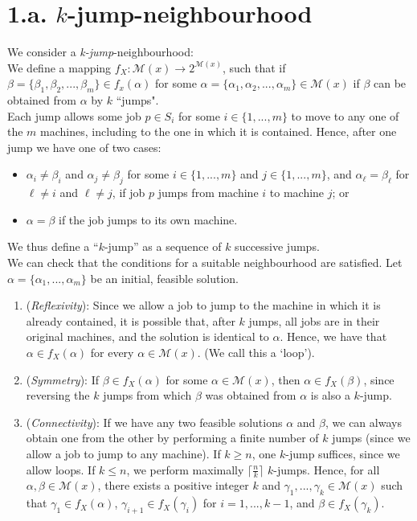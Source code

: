 \documentclass[12pt,a4paper,reqno]{article}
\begin{document}
\section*{1.a. $k$-jump-neighbourhood}

We consider a \textit{k-jump}-neighbourhood: \\

We define a mapping $f_X: \mathcal{M}(x) \rightarrow 2^{\mathcal{M}(x)}$, such that if $\beta = \{\beta_1,\beta_2,...,\beta_m \} \in f_x(\alpha)$ for some $\alpha = \{\alpha_1,\alpha_2,...,\alpha_m \} \in \mathcal{M}(x)$ if $\beta$ can be obtained from $\alpha$ by $k$ ``jumps". \\

Each jump allows some job $p \in S_i$ for some $i \in \{1,...,m\}$ to move to any one of the $m$ machines, including to the one in which it is contained. Hence, after one jump we have one of two cases:
\begin{itemize}
\item $\alpha_i \neq \beta_i$ and $\alpha_j \neq \beta_j$ for some $i \in \{1,...,m\}$ and $j \in \{1,...,m\}$, and $\alpha_\ell = \beta_\ell$ for $\ell \neq i$ and $\ell \neq j$, if job $p$ jumps from machine $i$ to machine $j$; or
\item $\alpha = \beta$ if the job jumps to its own machine.
\end{itemize}

We thus define a ``$k$-jump'' as a sequence of $k$ successive jumps. \\

We can check that the conditions for a suitable neighbourhood are satisfied. Let $\alpha = \{\alpha_1,...,\alpha_m\}$ be an initial, feasible solution.
\begin{enumerate}

\item (\textit{Reflexivity}): Since we allow a job to jump to the machine in which it is already contained, it is possible that, after $k$ jumps, all jobs are in their original machines, and the solution is identical to $\alpha$. Hence, we have that $\alpha \in f_X(\alpha)$ for every $\alpha \in \mathcal{M}(x)$. (We call this a `loop').

\item (\textit{Symmetry}): If $\beta \in f_X(\alpha)$ for some $\alpha \in \mathcal{M}(x)$, then $\alpha \in f_X(\beta)$, since reversing the $k$ jumps from which $\beta$ was obtained from $\alpha$ is also a $k$-jump.

\item (\textit{Connectivity}): If we have any two feasible solutions $\alpha$ and $\beta$, we can always obtain one from the other by performing a finite number of $k$ jumps (since we allow a job to jump to any machine). If $k \geq n$, one $k$-jump suffices, since we allow loops. If $k \leq n$, we perform maximally $\lceil \frac{n}{k} \rceil$ $k$-jumps. Hence, for all $\alpha, \beta \in \mathcal{M}(x)$, there exists a positive integer $k$ and $\gamma_1,...,\gamma_k \in \mathcal{M}(x)$ such that $\gamma_1 \in f_X(\alpha)$, $\gamma_{i+1} \in f_X(\gamma_i)$ for $i=1,...,k-1$, and $\beta \in f_X(\gamma_k)$.

\end{enumerate}
\end{document}
